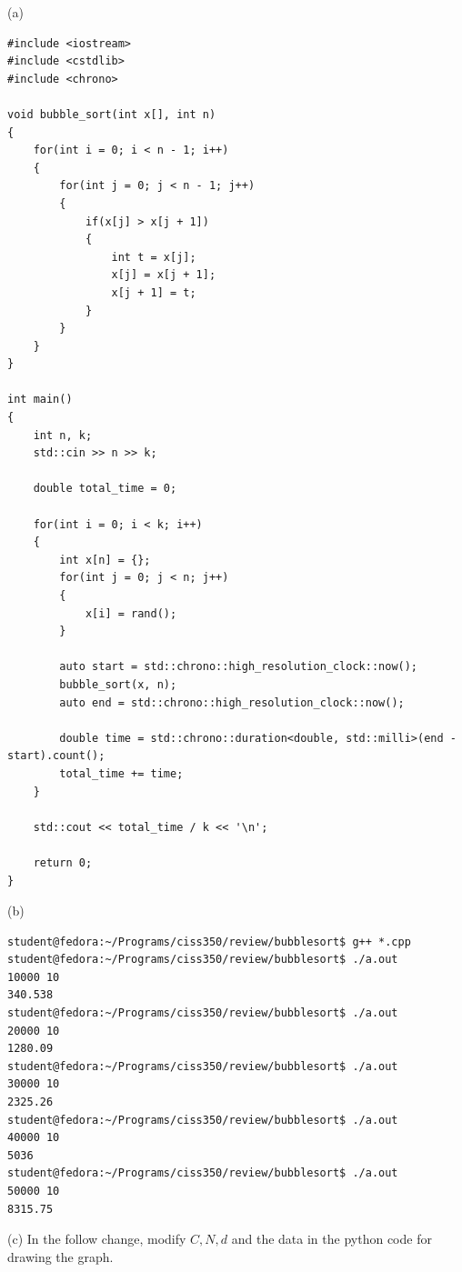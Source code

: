 
(a)
\begin{Verbatim}[frame=single, fontsize=\small]
#include <iostream>
#include <cstdlib>
#include <chrono>

void bubble_sort(int x[], int n)
{
    for(int i = 0; i < n - 1; i++)
    {
        for(int j = 0; j < n - 1; j++)
        {
            if(x[j] > x[j + 1])
            {
                int t = x[j];
                x[j] = x[j + 1];
                x[j + 1] = t;
            }
        }
    }
}

int main()
{
    int n, k;
    std::cin >> n >> k;

    double total_time = 0;

    for(int i = 0; i < k; i++)
    {
        int x[n] = {};
        for(int j = 0; j < n; j++)
        {
            x[i] = rand();
        }
        
        auto start = std::chrono::high_resolution_clock::now();
        bubble_sort(x, n);
        auto end = std::chrono::high_resolution_clock::now();

        double time = std::chrono::duration<double, std::milli>(end - start).count();
        total_time += time;
    }

    std::cout << total_time / k << '\n';
    
    return 0;
}
\end{Verbatim}

(b)
\begin{Verbatim}[frame=single, fontsize=\small]
student@fedora:~/Programs/ciss350/review/bubblesort$ g++ *.cpp
student@fedora:~/Programs/ciss350/review/bubblesort$ ./a.out
10000 10
340.538
student@fedora:~/Programs/ciss350/review/bubblesort$ ./a.out
20000 10
1280.09
student@fedora:~/Programs/ciss350/review/bubblesort$ ./a.out
30000 10 
2325.26
student@fedora:~/Programs/ciss350/review/bubblesort$ ./a.out
40000 10
5036
student@fedora:~/Programs/ciss350/review/bubblesort$ ./a.out
50000 10  
8315.75

\end{Verbatim}

(c) In the follow change, modify $C, N, d$ and the data in the
python code for drawing the graph.

